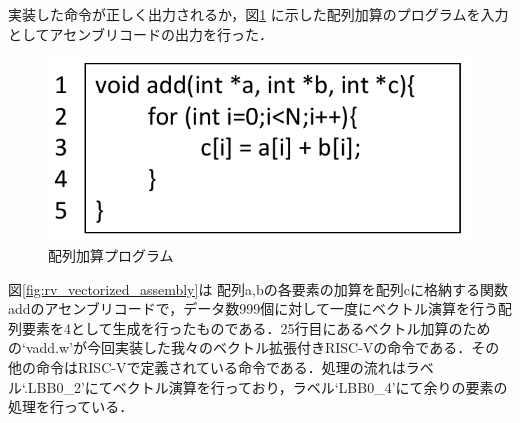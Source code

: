 
実装した命令が正しく出力されるか，図\ref{fig:add_array_c}
に示した配列加算のプログラムを入力としてアセンブリコードの出力を行った．

\begin{figure}
    \centering
    \includegraphics[scale=0.6]{image/add_array_c.pdf}
    \caption{配列加算プログラム}
    \label{fig:add_array_c}
\end{figure}

図\ref{fig:rv_vectorized_assembly}は
配列a,bの各要素の加算を配列cに格納する関数addのアセンブリコードで，データ数999個に対して一度にベクトル演算を行う配列要素を4として生成を行ったものである．25行目にあるベクトル加算のための`vadd.w'が今回実装した我々のベクトル拡張付きRISC-Vの命令である．その他の命令はRISC-Vで定義されている命令である．処理の流れはラベル`.LBB0\_2'にてベクトル演算を行っており，ラベル`LBB0\_4'にて余りの要素の処理を行っている．

